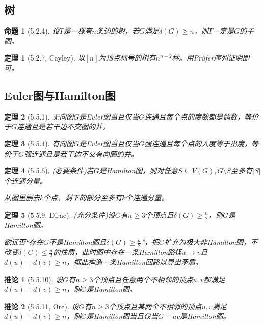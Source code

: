 \documentclass[landscape, a4paper]{article}
\theoremstyle{compact}
\newtheorem{theorem}{定理}
\newtheorem{corollary}{推论}
\newtheorem{proposition}{命题}
\def\le{\leqslant}
\def\ge{\geqslant}
\begin{document}
\begin{multicols}{3}
\subsection{树}
\begin{proposition}[5.2.4]
	设$T$是一棵有$n$条边的树，若$G$满足$\delta(G) \ge n$，则$T$一定是$G$的子图。
\end{proposition}
\begin{theorem}[5.2.7, Cayley]
	以$[n]$为顶点标号的树有$n^{n-2}$种。\textit{用Pr\"ufer序列证明即可。}
\end{theorem}
\subsection{Euler图与Hamilton图}
\begin{theorem}[5.5.1]
	无向图$G$是Euler图当且仅当$G$连通且每个点的度数都是偶数，等价于$G$连通且是若干边不交圈的并。
\end{theorem}
\begin{theorem}[5.5.4]
	有向图$G$是Euler图当且仅当$G$强连通且每个点的入度等于出度，等价于$G$强连通且是若干边不交有向圈的并。
\end{theorem}
\begin{theorem}[5.5.6]
	(必要条件)若$G$是Hamilton图，则对任意$S \subseteq V(G), G \setminus S$至多有$|S|$个连通分量。
	
	\textit{从圈里删去$k$个点，剩下的部分至多有$k$个连通分量。}
\end{theorem}
\begin{theorem}[5.5.9, Dirac]
	(充分条件)设$G$有$n \ge 3$个顶点且$\delta(G) \ge \frac n2$，则$G$是Hamilton图。
	
	\textit{欲证否“存在$G$不是Hamilton图且$\delta(G) \ge \frac n2$”，把$G$扩充为极大非Hamilton图，不改变$\delta(G) \le \frac n2$的性质，此时图中存在一条Hamilton路径$u \to v$且$d(u) + d(v) \ge n$，据此构造一条Hamilton回路以导出矛盾。}
\end{theorem}
\begin{corollary}[5.5.10]
	设$G$有$n \ge 3$个顶点且任意两个不相邻的顶点$u, v$都满足$d(u) + d(v) \ge n$，则$G$是Hamilton图。
\end{corollary}
\begin{corollary}[5.5.11, Ore]
	设$G$有$n \ge 3$个顶点且某两个不相邻的顶点$u, v$满足$d(u) + d(v) \ge n$，则$G$是Hamilton图当且仅当$G + uv$是Hamilton图。
\end{corollary}

\end{multicols}
\end{document}
